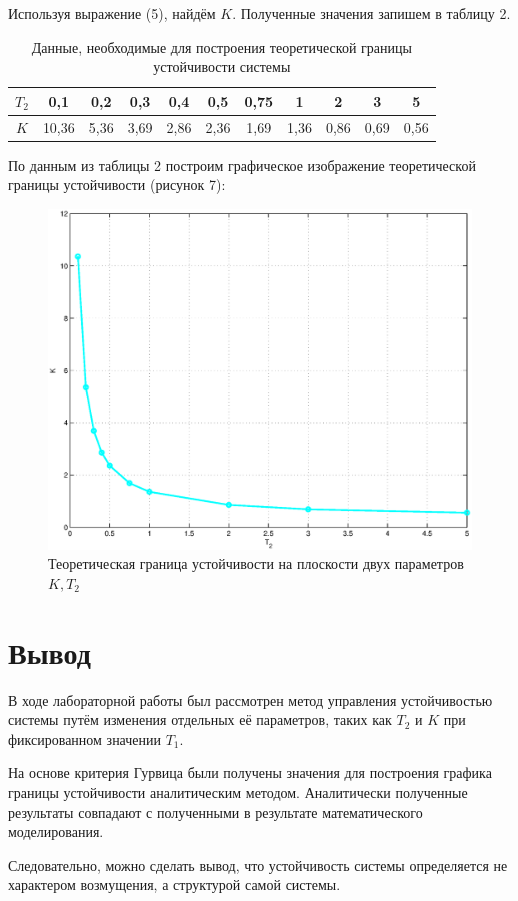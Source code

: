 \documentclass[12pt,a4paper]{article}
\begin{document}
Используя выражение (5), найдём $K$. Полученные значения запишем в таблицу 2.
\begin{table}[h!]
	\caption{Данные, необходимые для построения теоретической границы устойчивости системы}
	\renewcommand{\arraystretch}{1.8} %
	\begin{center}
		\begin{tabular}{|c|c|c|c|c|c|c|c|c|c|c|}
			\hline $T_2$ & 0,1 & 0,2 & 0,3 & 0,4 & 0,5 & 0,75 & 1 & 2 & 3 & 5\\
			\hline $K$ & 10,36 & 5,36 & 3,69 & 2,86 & 2,36 & 1,69 & 1,36 & 0,86 & 0,69 & 0,56\\
			\hline
		\end{tabular}	
	\end{center}
\end{table}  
 
По данным из таблицы 2 построим графическое изображение теоретической границы устойчивости (рисунок 7):
\begin{figure}[H]
	\centering
	\includegraphics[width=0.9\linewidth]{scheme8lab/plot4.eps}
	\caption{Теоретическая граница устойчивости на плоскости двух параметров $K, T_2$}
\end{figure}

\newpage
\section*{Вывод}
\par
В ходе лабораторной работы был рассмотрен метод управления устойчивостью системы путём изменения отдельных её параметров, таких как  $T_2$ и $K$ при фиксированном значении $T_1$.
\par
На основе критерия Гурвица были получены значения для построения графика границы устойчивости аналитическим методом. Аналитически полученные результаты совпадают с полученными в результате математического моделирования.
\par
Следовательно, можно сделать вывод, что устойчивость системы определяется не характером возмущения, а структурой самой системы.
\end{document}
